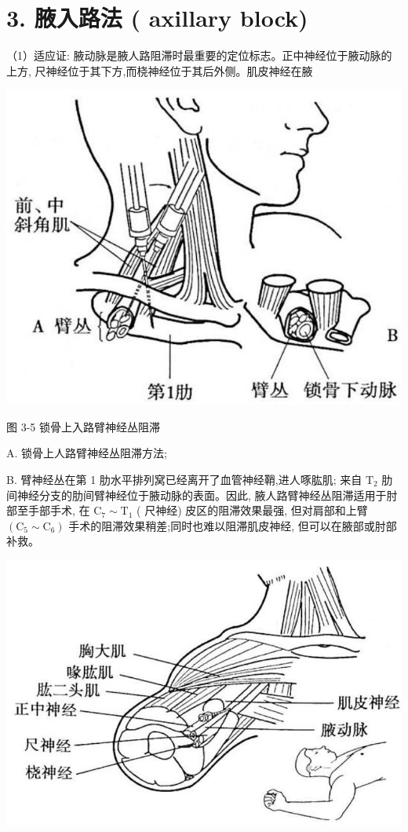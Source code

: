 \documentclass[10pt]{article}
\begin{document}
\section*{3. 腋入路法 ( axillary block)}
（1）适应证: 腋动脉是腋人路阻滞时最重要的定位标志。正中神经位于腋动脉的上方, 尺神经位于其下方,而桡神经位于其后外侧。肌皮神经在腋

\begin{center}
\includegraphics[max width=\textwidth]{2024_07_09_002a177993bd97d1d6d7g-054(1)}
\end{center}

图 3-5 锁骨上入路臂神经丛阻滞

A. 锁骨上人路臂神经丛阻滞方法;

B. 臂神经丛在第 1 肋水平排列窝已经离开了血管神经鞘,进人啄肱肌; 来自 $\mathrm{T}_{2}$ 肋间神经分支的肋间臂神经位于腋动脉的表面。因此, 腋人路臂神经丛阻滞适用于肘部至手部手术, 在 $\mathrm{C}_{7} \sim \mathrm{T}_{1}$ ( 尺神经) 皮区的阻滞效果最强, 但对肩部和上臂 $\left(\mathrm{C}_{5} \sim \mathrm{C}_{6}\right)$ 手术的阻滞效果稍差;同时也难以阻滞肌皮神经, 但可以在腋部或肘部补救。

\begin{center}
\includegraphics[max width=\textwidth]{2024_07_09_002a177993bd97d1d6d7g-054}
\end{center}
\end{document}
